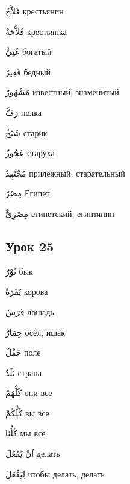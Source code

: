 \documentclass[a5paper]{article}
\newcommand\textstyleDropCaps[1]{#1}
\newcommand\textstyleCaptioncharacters[1]{#1}
\begin{document}
\textstyleCaptioncharacters{فَلاَّحٌ }\textstyleDropCaps{крестьянин‎}

\textstyleCaptioncharacters{فَلاَّحَةٌ }\textstyleDropCaps{крестьянка‎}

\textstyleCaptioncharacters{غَنِيٌّ }\textstyleDropCaps{богатый‎}

\textstyleCaptioncharacters{فَقِيرٌ }\textstyleDropCaps{бедный‎}

\textstyleCaptioncharacters{مَشْهُورٌ }\textstyleDropCaps{известный, знамен­итый‎}

\textstyleCaptioncharacters{رَفٌّ }\textstyleDropCaps{полка‎}

\textstyleCaptioncharacters{شَيْخٌ }\textstyleDropCaps{старик‎}

\textstyleCaptioncharacters{عَجُوزٌ }\textstyleDropCaps{старуха‎}

\textstyleCaptioncharacters{مُجْتَهِدٌ }\textstyleDropCaps{прилежный, ста­рательный‎}

\textstyleCaptioncharacters{مِصْرٌ }\textstyleDropCaps{Египет‎}

\textstyleCaptioncharacters{مِصْرِىٌّ }\textstyleDropCaps{египетский, егип­тянин‎}

\subsection[Урок 25‎]{\textstyleDropCaps{Урок 25‎}}
\textstyleCaptioncharacters{ثَوْرٌ }\textstyleDropCaps{бык‎}

\textstyleCaptioncharacters{بَقَرَةٌ }\textstyleDropCaps{корова‎}

\textstyleCaptioncharacters{فَرَسٌ }\textstyleDropCaps{лошадь‎}

\textstyleCaptioncharacters{حِمَارٌ }\textstyleDropCaps{осёл, ишак‎}

\textstyleCaptioncharacters{حَقْلٌ }\textstyleDropCaps{поле‎}

\textstyleCaptioncharacters{بَلَدٌ }\textstyleDropCaps{страна‎}

\textstyleCaptioncharacters{كُلُّهُمْ }\textstyleDropCaps{они все‎}

\textstyleCaptioncharacters{كُلُّكُمْ }\textstyleDropCaps{вы все‎}

\textstyleCaptioncharacters{كُلُّنَا }\textstyleDropCaps{мы все‎}

\textstyleCaptioncharacters{اَنْ يَفْعَلَ }\textstyleDropCaps{делать‎}

\textstyleCaptioncharacters{لِيَفْعَلَ }\textstyleDropCaps{чтобы делать, де­лать‎}
\end{document}
